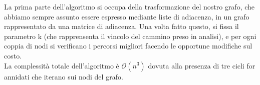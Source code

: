 \documentclass[../cheatSheetAlgoritmi.tex]{subfiles}
\begin{document}
La prima parte dell'algoritmo si occupa della trasformazione del nostro grafo, che abbiamo sempre assunto essere espresso mediante liste di adiacenza, in un grafo rappresentato da una matrice di adiacenza. Una volta fatto questo, si fissa il parametro k (che rapprensenta il vincolo del cammino preso in analisi), e per ogni coppia di nodi si verificano i percorsi migliori facendo le opportune modifiche sul costo. \\
La complessità totale dell'algoritmo è $\mathcal{O}(n^3)$ dovuta alla presenza di tre cicli for annidati che iterano sui nodi del grafo.
\end{document}
